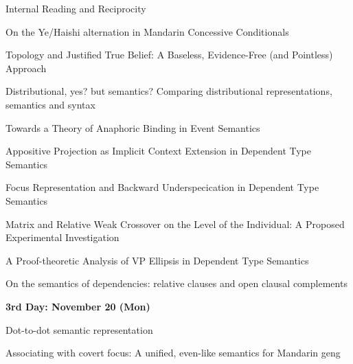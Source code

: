 \documentclass[12pt]{jarticle}
\begin{document}
      {Internal Reading and Reciprocity}
      {}
  
      {On the Ye/Haishi alternation in Mandarin Concessive Conditionals}
      {}




  
      {Topology and Justified True Belief: A Baseless, Evidence-Free (and Pointless) Approach}
      {}
  
      {Distributional, yes? but semantics? Comparing distributional representations, semantics and syntax}
      {}
  
      {Towards a Theory of Anaphoric Binding in Event Semantics}
      {}




  
      {Appositive Projection as Implicit Context Extension in Dependent Type Semantics}
      {}
  
      {Focus Representation and Backward Underspecication in Dependent Type Semantics}
      {}
  
      {Matrix and Relative Weak Crossover on the Level of the Individual: A Proposed Experimental Investigation}
      {}




  
      {A Proof-theoretic Analysis of VP Ellipsis in Dependent Type Semantics}
      {}
  
      {On the semantics of dependencies: relative clauses and open clausal complements}
      {}







\noindent\textbf{\large 
3rd Day: November 20 (Mon)
}\\




  
      {Dot-to-dot semantic representation}
      {}
  
      {Associating with covert focus: A unified, even-like semantics for Mandarin geng}
      {}
  
\end{document}
